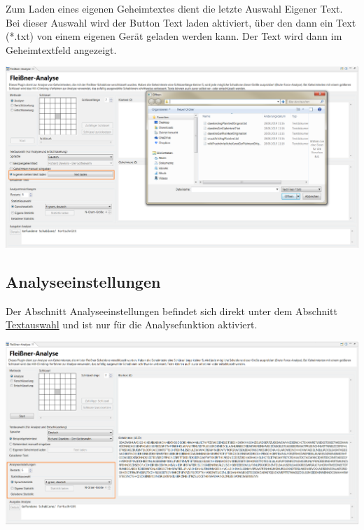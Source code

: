 \documentclass[fontsize=12pt, DIV=15, parskip=half-]{scrartcl}
\theoremstyle{break}
\begin{document}
Zum Laden eines eigenen Geheimtextes dient die letzte Auswahl \glqq Eigener Text\grqq. Bei dieser Auswahl wird der Button \glqq Text laden\grqq{} aktiviert, über den dann ein Text (*.txt) von einem eigenen Gerät geladen werden kann. Der Text wird dann im Geheimtextfeld angezeigt.

\includegraphics[scale=0.45]{FleissnerCipherLoadOwn.png}


\subsection{Analyseeinstellungen}
Der Abschnitt \glqq Analyseeinstellungen\grqq{} befindet sich direkt unter dem Abschnitt \glqq\hyperlink{txtausw}{Textauswahl}\grqq{} und ist nur für die Analysefunktion aktiviert.

\includegraphics[scale=0.45]{FleissnerAnalysisSettings.png}
\end{document}
